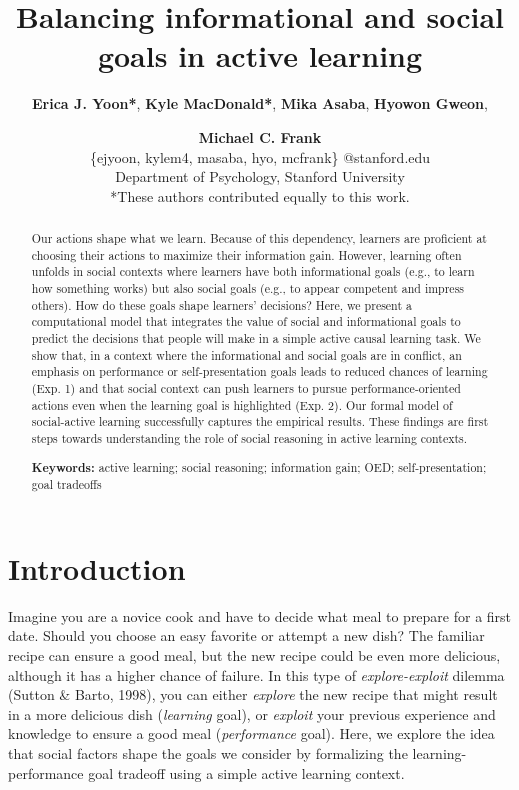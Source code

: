 \documentclass[10pt, letterpaper]{article}
\title{Balancing informational and social goals in active learning}
\author{{\large \bf Erica J. Yoon*}, {\large \bf Kyle MacDonald*}, {\large \bf Mika Asaba}, {\large \bf Hyowon Gweon}, \and {\large \bf Michael C. Frank} \\ \{ejyoon, kylem4, masaba, hyo, mcfrank\} @stanford.edu \\ Department of Psychology, Stanford University \\ *These authors contributed equally to this work.}
\begin{document}
\maketitle

\begin{abstract}
Our actions shape what we learn. Because of this dependency, learners
are proficient at choosing their actions to maximize their information
gain. However, learning often unfolds in social contexts where learners
have both informational goals (e.g., to learn how something works) but
also social goals (e.g., to appear competent and impress others). How do
these goals shape learners' decisions? Here, we present a computational
model that integrates the value of social and informational goals to
predict the decisions that people will make in a simple active causal
learning task. We show that, in a context where the informational and
social goals are in conflict, an emphasis on performance or
self-presentation goals leads to reduced chances of learning (Exp. 1)
and that social context can push learners to pursue performance-oriented
actions even when the learning goal is highlighted (Exp. 2). Our formal
model of social-active learning successfully captures the empirical
results. These findings are first steps towards understanding the role
of social reasoning in active learning contexts.

\textbf{Keywords:}
active learning; social reasoning; information gain; OED;
self-presentation; goal tradeoffs
\end{abstract}

\section{Introduction}\label{introduction}

Imagine you are a novice cook and have to decide what meal to prepare
for a first date. Should you choose an easy favorite or attempt a new
dish? The familiar recipe can ensure a good meal, but the new recipe
could be even more delicious, although it has a higher chance of
failure. In this type of \emph{explore-exploit} dilemma (Sutton \&
Barto, 1998), you can either \emph{explore} the new recipe that might
result in a more delicious dish (\emph{learning} goal), or
\emph{exploit} your previous experience and knowledge to ensure a good
meal (\emph{performance} goal). Here, we explore the idea that social
factors shape the goals we consider by formalizing the
learning-performance goal tradeoff using a simple active learning
context.
\end{document}
